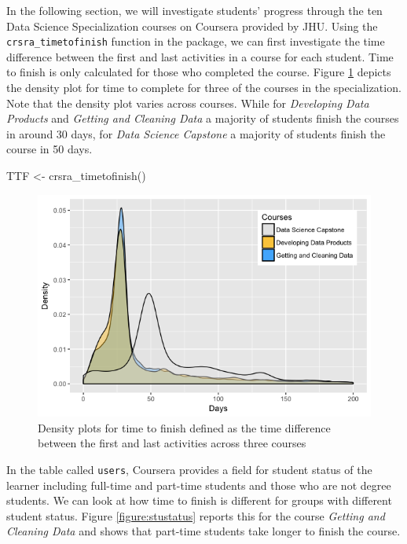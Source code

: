In the following section, we will investigate students' progress through
the ten Data Science Specialization courses on Coursera provided by JHU.
Using the \texttt{crsra\_timetofinish} function in the 
package, we can first investigate the time difference between the first
and last activities in a course for each student. Time to finish is only
calculated for those who completed the course. Figure
\ref{figure:timetofinish} depicts the density plot for time to complete
for three of the courses in the specialization. Note that the density
plot varies across courses. While for \emph{Developing Data Products}
and \emph{Getting and Cleaning Data} a majority of students finish the
courses in around 30 days, for \emph{Data Science Capstone} a majority
of students finish the course in 50 days.

\begin{Schunk}
\begin{Sinput}
TTF <- crsra_timetofinish()
\end{Sinput}
\end{Schunk}

\begin{figure}[htbp]
    \centering
    \includegraphics[scale=0.5]{timetofinish}
    \caption{Density plots for time to finish defined as the time difference between the first and last activities across three courses}
    \label{figure:timetofinish}
\end{figure}

In the table called \texttt{users}, Coursera provides a field for
student status of the learner including full-time and part-time students
and those who are not degree students. We can look at how time to finish
is different for groups with different student status. Figure
\ref{figure:stustatus} reports this for the course \emph{Getting and
Cleaning Data} and shows that part-time students take longer to finish
the course.

